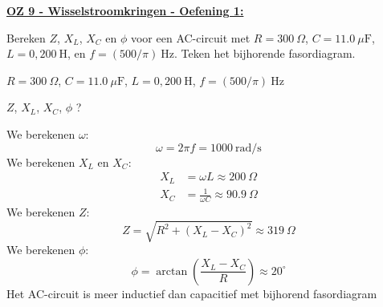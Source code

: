 \textbf{\underline{OZ 9 - Wisselstroomkringen - Oefening 1:}}
\vspace{0.5cm}

Bereken $Z$, $X_L$, $X_C$ en $\phi$ voor een AC-circuit met $R = 300 \ \Omega$, $C = 11.0 \ \mu\text{F}$, $L = 0,200 \ \text{H}$, en $f = (500/\pi) \ \text{Hz}$. Teken het bijhorende fasordiagram.


\begin{description}[labelwidth=1.5cm, leftmargin=!]
    \item[Geg. :]  $R = 300 \ \Omega$, $C = 11.0 \ \mu\text{F}$, $L = 0,200 \ \text{H}$, $f = (500/\pi) \ \text{Hz}$ 
    \item[Gevr. :] $Z$, $X_L$, $X_C$, $\phi$ ?
    \item[Opl. :]   
        We berekenen $\omega$:
        \begin{equation*}
            \omega = 2\pi f = 1000 \ \text{rad/s}
        \end{equation*}
        We berekenen $X_L$ en $X_C$:
        \begin{align*}
            X_L &= \omega L \approx 200 \ \Omega \\ X_C &= \frac{1}{\omega C} \approx 90.9 \ \Omega
        \end{align*}
        We berekenen $Z$:
        \begin{equation*}
            Z = \sqrt{R^2 + (X_L - X_C)^2} \approx 319 \ \Omega
        \end{equation*}
        We berekenen $\phi$:
        \begin{equation*}
            \phi = \arctan\left(\frac{X_L - X_C}{R}\right) \approx 20^\circ
        \end{equation*}
        Het AC-circuit is meer inductief dan capacitief met bijhorend fasordiagram
        \begin{center}

\end{center}
\end{description}
